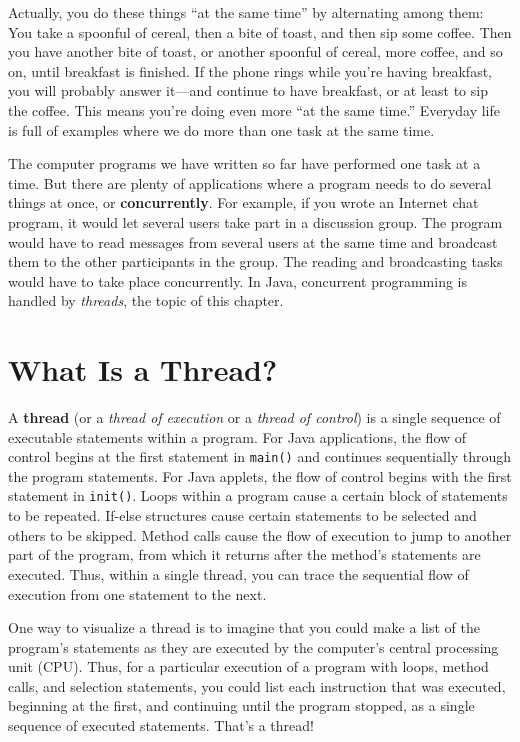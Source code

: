 Actually, you do these things ``at the same time'' by alternating
among them: You take a spoonful of cereal, then a bite of toast, and
then sip some coffee.  Then you have another bite of toast, or another
spoonful of cereal, more coffee, and so on, until breakfast is
finished.  If the phone rings while you're having breakfast, you will
probably answer it---and continue to have breakfast, or at least to
sip the coffee.  This means you're doing even more ``at the same
time.''  Everyday life is full of examples where we do more than one
task at the same time.

The computer programs we have written so far have performed one task
at a time.  But there are plenty of applications where a program needs
to do several things at once, or {\bf
concurrently}.  For example, if you wrote an
Internet chat program, it would let several users take part in a
discussion group.  The program would have to read messages from
several users at the same time and broadcast them to the other
participants in the group.  The reading and broadcasting tasks would
have to take place concurrently. In Java, concurrent programming is
handled by {\it threads}, the topic of this chapter.

\section{What Is a Thread?}
\noindent A {\bf thread} (or a {\it thread of execution} or a {\it thread of
control}) is a single sequence of executable statements within a
program.  For Java applications, the flow of control begins at the
first statement in {\tt main()} and continues sequentially through the
program statements.  For Java applets, the flow of control
begins with the first statement in {\tt init()}.  Loops within a
program cause a certain block of statements to be repeated.  If-else
structures cause certain statements to be selected and others to be
skipped.  Method calls cause the flow of execution to jump to another
part of the program, from which it returns after the method's
statements are executed.   Thus, within a single thread, you can trace
the sequential flow of execution from one statement to the next.

One way to visualize a thread is to imagine that you could make a
list of the program's statements as they are executed by the
computer's central processing unit (CPU).  Thus, for a particular
execution of a program with loops, method calls, and selection
statements, you could list each instruction that was executed,
beginning at the first, and continuing until the program stopped, as a
single sequence of executed statements.  That's a thread!


